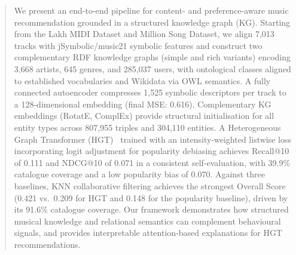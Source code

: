 \begin{abstract}
We present an end-to-end pipeline for content- and preference-aware music recommendation grounded in a structured knowledge graph (KG). Starting from the Lakh MIDI Dataset and Million Song Dataset, we align 7,013 tracks with jSymbolic/music21 symbolic features and construct two complementary RDF knowledge graphs (simple and rich variants) encoding 3,668 artists, 645 genres, and 285,037 users, with ontological classes aligned to established vocabularies and Wikidata via OWL semantics. A fully connected autoencoder compresses 1,525 symbolic descriptors per track to a 128-dimensional embedding (final MSE: 0.616). Complementary KG embeddings (RotatE, ComplEx) provide structural initialisation for all entity types across 807,955 triples and 304,110 entities. A Heterogeneous Graph Transformer (HGT)~\cite{hu2020hgt} trained with an intensity-weighted listwise loss incorporating logit adjustment for popularity debiasing achieves Recall@10 of 0.111 and NDCG@10 of 0.071 in a consistent self-evaluation, with 39.9\% catalogue coverage and a low popularity bias of 0.070. Against three baselines, KNN collaborative filtering achieves the strongest Overall Score (0.421 vs.\ 0.209 for HGT and 0.148 for the popularity baseline), driven by its 91.6\% catalogue coverage. Our framework demonstrates how structured musical knowledge and relational semantics can complement behavioural signals, and provides interpretable attention-based explanations for HGT recommendations.
\end{abstract}

